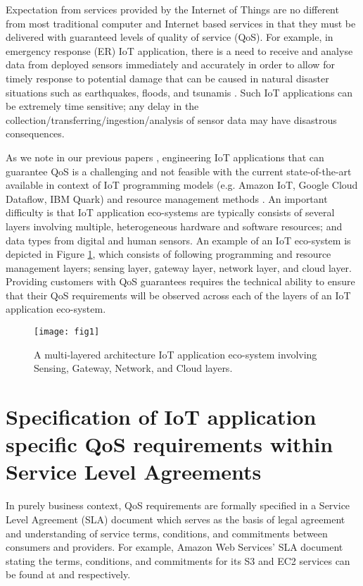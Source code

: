 Expectation from services provided by the Internet of Things are no different from most traditional computer and Internet based services in that they must be delivered with guaranteed levels of quality of service (QoS).
For example, in emergency response (ER) IoT application, there is a need to receive and analyse data from deployed sensors immediately and accurately in order to allow for timely response to potential damage that can be caused in natural disaster situations such as earthquakes, floods, and tsunamis \cite{ref12}.
Such IoT applications can be extremely time sensitive; any delay in the collection/transferring/ingestion/analysis of sensor data may have disastrous consequences.

As we note in our previous papers \cite{ref4,ref13}, engineering IoT applications that can guarantee QoS is a challenging and not feasible with the current state-of-the-art available in context of IoT programming models (e.g. Amazon IoT, Google Cloud Dataflow, IBM Quark) and resource management methods \cite{ref4,ref33}.
An important difficulty is that IoT application eco-systems are typically consists of several layers involving multiple, heterogeneous hardware and software resources;
and data types from digital and human sensors. An example of an IoT eco-system is depicted in Figure \ref{fig:1},
which consists of following programming and resource management layers; sensing layer, gateway layer, network layer, and cloud layer.
Providing customers with QoS guarantees requires the technical ability to ensure that their QoS requirements will be observed across each of the layers of an IoT application eco-system.

\begin{figure}[h]
    \centering
    \texttt{[image: fig1]}
    \caption{A multi-layered architecture IoT application eco-system involving Sensing, Gateway, Network, and Cloud layers.}
    \label{fig:1}
\end{figure}

\section{Specification of IoT application specific QoS requirements within Service Level Agreements}

In purely business context, QoS requirements are formally specified in a Service Level Agreement (SLA) document \cite{ref3} which serves as the basis of legal agreement and understanding of service terms, conditions, and commitments between consumers and providers.
For example, Amazon Web Services' SLA document stating the terms, conditions, and commitments for its S3 and EC2 services can be found at \cite{ref34} and \cite{ref35} respectively.

